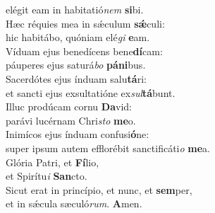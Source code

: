 \evenverse elégit eam in habitatió\textit{nem} \textbf{si}bi.\\
\oddverse Hæc réquies mea in sǽculum \textbf{sǽ}culi:~\*\\
\oddverse hic habitábo, quóniam elé\textit{gi} \textbf{e}am.\\
\evenverse Víduam ejus benedícens bene\textbf{dí}cam:~\*\\
\evenverse páuperes ejus saturá\textit{bo} \textbf{pá}\textbf{ni}bus.\\
\oddverse Sacerdótes ejus índuam salu\textbf{tá}ri:~\*\\
\oddverse et sancti ejus exsultatióne ex\textit{sul}\textbf{tá}bunt.\\
\evenverse Illuc prodúcam cornu \textbf{Da}vid:~\*\\
\evenverse parávi lucérnam Chri\textit{sto} \textbf{me}o.\\
\oddverse Inimícos ejus índuam confusi\textbf{ó}ne:~\*\\
\oddverse super ipsum autem efflorébit sanctificáti\textit{o} \textbf{me}a.\\
\evenverse Glória Patri, et \textbf{Fí}lio,~\*\\
\evenverse et Spirítu\textit{i} \textbf{San}cto.\\
\oddverse Sicut erat in princípio, et nunc, et \textbf{sem}per,~\*\\
\oddverse et in sǽcula sæculó\textit{rum}. \textbf{A}men.\\
